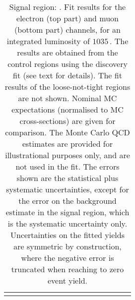 \begin{table}
\begin{center}
{\begin{tabular*}{\textwidth}{@{\extracolsep{\fill}}lrrrrrrrrrrrrrrr}
\noalign{\smallskip}\hline\noalign{\smallskip}
\end{tabular*}
}
\end{center}
\caption{Signal region: . Fit results for the electron (top part) and muon (bottom part) channels, for an integrated luminosity of $1035$\,\ipb.
The results are obtained from the control regions using the discovery fit (see text for details). The fit results of the loose-not-tight regions are not shown.
Nominal MC expectations (normalised to MC cross-sections) are given for comparison. 
The Monte Carlo QCD estimates are provided for illustrational purposes only, and are not used in the fit.
The errors shown are the statistical plus systematic uncertainties, except for the error on the background estimate in the signal region, which is the systematic uncertainty only.
Uncertainties on the fitted yields are symmetric by construction, 
where the negative error is truncated when reaching to zero event yield.
}
\label{table.results.systematics.in.logL.fit.table.results.yields}
\end{table}
%